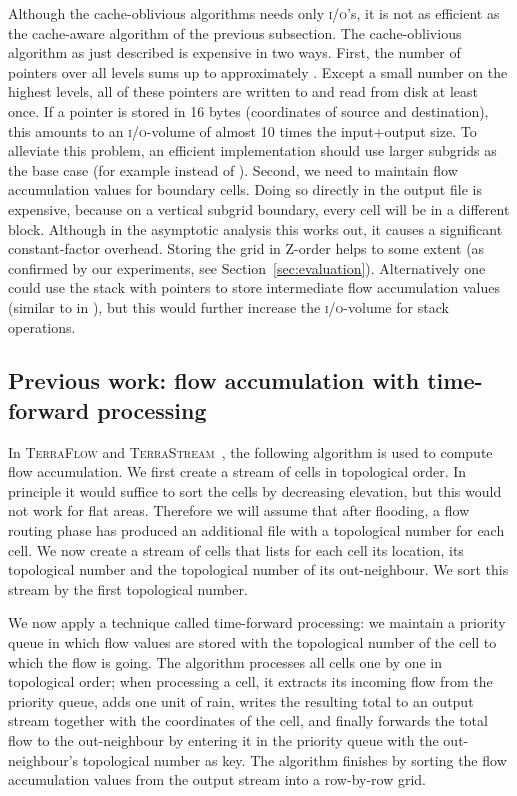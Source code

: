 \documentclass[10pt,a4paper]{article}
\def\io{\textsc{i/o}\xspace}
\def\ios{\textsc{i/o}'s\xspace}
\def\tsm{\textsc{TerraStream}\xspace}
\def\tfl{\textsc{TerraFlow}\xspace}
\begin{document}
Although the cache-oblivious algorithms needs only  \ios, it is not as efficient as the cache-aware algorithm of the previous subsection. The cache-oblivious algorithm as just described is expensive in two ways. First, the number of pointers over all levels sums up to approximately . Except a small number on the highest levels, all of these pointers are written to and read from disk at least once. If a pointer is stored in 16 bytes (coordinates of source and destination), this amounts to an \io-volume of almost 10 times the input+output size. To alleviate this problem, an efficient implementation should use larger subgrids as the base case (for example  instead of ). Second, we need to maintain flow accumulation values for boundary cells. Doing so directly in the output file is expensive, because on a vertical subgrid boundary, every cell will be in a different block. Although in the asymptotic analysis this works out, it causes a significant constant-factor overhead. Storing the grid in Z-order helps to some extent (as confirmed by our experiments, see Section~\ref{sec:evaluation}). Alternatively one could use the stack with pointers to store intermediate flow accumulation values (similar to  in ), but this would further increase the \io-volume for stack operations.

\subsection{Previous work: flow accumulation with time-forward processing}\label{sec:tfpaccumulation}

In \tfl and \tsm~\cite{terraflow,terrastream}, the following algorithm is used to compute flow accumulation. We first create a stream of cells in topological order. In principle it would suffice to sort the cells by decreasing elevation, but this would not work for flat areas. Therefore we will assume that after flooding, a flow routing phase has produced an additional file with a topological number for each cell. We now create a stream of cells that lists for each cell its location, its topological number and the topological number of its out-neighbour. We sort this stream by the first topological number.

We now apply a technique called time-forward processing: we maintain a priority queue in which flow values are stored with the topological number of the cell to which the flow is going. The algorithm processes all cells one by one in topological order; when processing a cell, it extracts its incoming flow from the priority queue, adds one unit of rain, writes the resulting total to an output stream together with the coordinates of the cell, and finally forwards the total flow to the out-neighbour by entering it in the priority queue with the out-neighbour's topological number as key. The algorithm finishes by sorting the flow accumulation values from the output stream into a row-by-row grid.
\end{document}

